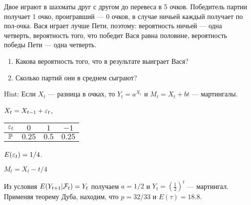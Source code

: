 \begin{problem}
Двое играют в шахматы друг с другом до перевеса в 5 очков. Победитель партии получает 1 очко, проигравший --- 0 очков, в случае ничьей каждый получает по пол-очка. Вася играет лучше Пети, поэтому: вероятность ничьей --- одна четверть, вероятность того, что победит Вася равна половине, вероятность победы Пети --- одна четверть. 
\begin{enumerate}
\item Какова вероятность того, что в результате выиграет Вася? 
\item Сколько партий они в среднем сыграют? 
\end{enumerate}

\end{problem} 
\begin{solution} 

Hint:  Если $X_{t}$ --- разница в очках, то $Y_t=a^{X_{t}}$ и $M_t=X_{t}+bt$ --- мартингалы. 

$X_t=X_{t-1}+\e_t$,

\begin{tabular}{cccc}
$\e_t$ & $0$ & $1$ & $-1$ \\ 
\hline 
$\P$ & $0.25$ & $0.5$ & $0.25$ \\ 
\end{tabular} 

$E(\e_t)=1/4$.

$M_t=X_t-t/4$

Из условия $E(Y_{t+1}|\cF_t)=Y_t$ получаем $a=1/2$ и $Y_t=\left( \frac{1}{2} \right)^t$ --- мартингал. Применяя теорему Дуба, находим, что $p=32/33$ и $E(\tau)=18.8$.


\end{solution}

